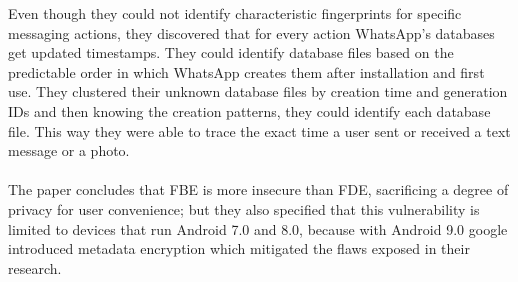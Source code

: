 Even though they could not identify characteristic fingerprints for specific messaging actions, they discovered that for every action WhatsApp's databases get updated timestamps. They could identify database files based on the predictable order in which WhatsApp creates them after installation and first use. 
They clustered their unknown database files by creation time and generation IDs and then knowing the creation patterns, they could identify each database file. This way they were able to trace the exact time a user sent or received a text message or a photo.
\\\\The paper concludes that FBE is more insecure than FDE, sacrificing a degree of privacy for user convenience; but they also specified that this vulnerability is limited to devices that run Android 7.0 and 8.0, because with Android 9.0 google introduced metadata encryption which mitigated the flaws exposed in their research.

